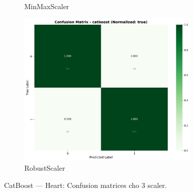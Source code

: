 \begin{figure}[H]
\begin{subfigure}[b]{0.31\textwidth}
\caption{MinMaxScaler}
\label{fig:cat_heart_cm_minmax}
\end{subfigure}\hfill
\begin{subfigure}[b]{0.31\textwidth}
\centering
\includegraphics[width=0.95\textwidth]{Result/heart_dataset/confusion_matrices/catboost_numeric_dataset_RobustScaler.png}
\caption{RobustScaler}
\label{fig:cat_heart_cm_robust}
\end{subfigure}
\caption{CatBoost — Heart: Confusion matrices cho 3 scaler.}
\label{fig:cat_heart_confusions}
\end{figure}

